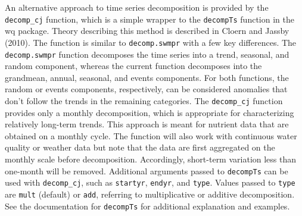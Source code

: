 \documentclass[10pt,letterpaper]{article}\usepackage[]{graphicx}\usepackage[]{color}
\begin{document}
An alternative approach to time series decomposition is provided by the \texttt{decomp\_cj} function, which is a simple wrapper to the \texttt{decompTs} function in the wq package.  Theory describing this method is described in Cloern and Jassby (2010).  The function is similar to \texttt{decomp.swmpr} with a few key differences.  The \texttt{decomp.swmpr} function decomposes the time series into a trend, seasonal, and random component, whereas the current function decomposes into the grandmean, annual, seasonal, and events components.  For both functions, the random or events components, respectively, can be considered anomalies that don't follow the trends in the remaining categories.  The \texttt{decomp\_cj} function provides only a monthly decomposition, which is appropriate for characterizing relatively long-term trends.  This approach is meant for nutrient data that are obtained on a monthly cycle.  The function will also work with continuous water quality or weather data but note that the data are first aggregated on the monthly scale before decomposition.  Accordingly, short-term variation less than one-month will be removed. Additional arguments passed to \texttt{decompTs} can be used with \texttt{decomp\_cj}, such as \texttt{startyr}, \texttt{endyr}, and \texttt{type}.  Values passed to \texttt{type} are \texttt{mult} (default) or \texttt{add}, referring to multiplicative or additive decomposition.  See the documentation for \texttt{decompTs} for additional explanation and examples.   
\end{document}

